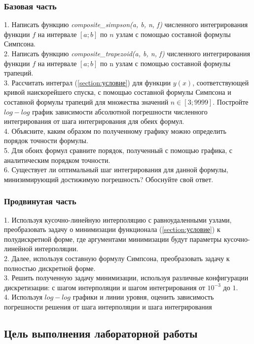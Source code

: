 \subsubsection*{Базовая часть}
1. Написать функцию \textit{composite_simpson(a, b, n, f)} численного интегрирования функции $f$ на интервале $[a; b]$ по $n$ узлам с помощью составной формулы Симпсона.\\
2. Написать функцию \textit{composite_trapezoid(a, b, n, f)} численного интегрирования функции $f$ на интервале $[a; b]$ по n узлам с помощью составной формулы трапеций. \\
3. Рассчитать интеграл (\ref{section:условие}) для функции $y(x)$, соответствующей кривой наискорейшего спуска, с помощью составной формулы Симпсона и составной формулы трапеций для множества значений $n \in [3;9999]$. Постройте $log-log$ график зависимости абсолютной погрешности численного интегрирования от шага интегрирования для обеих формул. \\
4. Объясните, каким образом по полученному графику можно определить порядок точности формулы. \\
5. Для обоих формул сравните порядок, полученный с помощью графика, с аналитическим порядком точности. \\
6. Существует ли оптимальный шаг интегрирования для данной формулы, минизимирующий достижимую погрешность? Обоснуйте свой ответ.
\subsubsection{Продвинутая часть}
1. Используя кусочно-линейную интерполяцию с равноудаленными узлами, преобразовать задачу о минимизации функционала (\ref{section:условие}) к полудискретной форме, где аргументами минимизации будут параметры кусочно-линейной интерполяции. \\
2. Далее, используя составную формулу Симпсона, преобразовать задачу к полностью дискретной форме. \\
3. Решить полученную задачу минимизации, используя различные конфигурации дискретизации: с шагом интерполяции и шагом интегрирования от $10^{-3}$ до $1$. \\
4. Используя $log-log$ графики и линии уровня, оценить зависимость погрешности решения от шага интерполяции и шага интегрирования
\subsection{Цель выполнения лабораторной работы}

